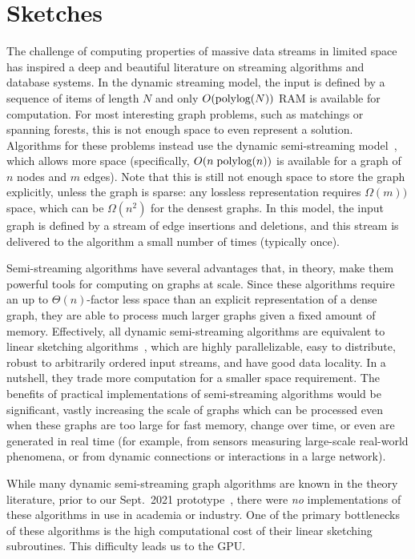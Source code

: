 \section{Sketches}



The challenge of computing properties of massive data streams in limited space has inspired a deep and beautiful literature on streaming algorithms and database systems. In the dynamic streaming model, the input is defined by a sequence of items of length $N$ and only $O(\textrm{polylog}{(N)})$ {RAM} is available for computation. For most interesting graph problems, such as matchings or spanning forests, this is not enough space to even represent a solution. Algorithms for these problems instead use the dynamic semi-streaming model~\cite{insertonlysemistreaming}, which allows more space (specifically, $O(n \; \textrm{polylog}{(n)})$  is available for a graph of $n$ nodes and $m$ edges). Note that this is still not enough space to store the graph explicitly, unless the graph is sparse: any lossless representation requires $\Omega(m))$ space, which can be $\Omega(n^2)$ for the densest graphs. In this model, the input graph is defined by a stream of edge insertions and deletions, and this stream is delivered to the algorithm a small number of times (typically once).

Semi-streaming algorithms have several advantages that, in theory, make them powerful tools for computing on graphs at scale.  Since these algorithms require an up to $\Theta(n)$-factor less space than an explicit representation of a dense graph, they are able to process much larger graphs given a fixed amount of memory. Effectively, all dynamic semi-streaming algorithms are equivalent to linear sketching algorithms~\cite{li2014sketchuniversal}, which are highly parallelizable, easy to distribute, robust to arbitrarily ordered input streams, and have good data locality. In a nutshell, they trade more computation for a smaller space requirement. %
The benefits of practical implementations of semi-streaming algorithms would be significant, vastly increasing the scale of graphs which can be processed even when these graphs are too large for fast memory, change over time, or even are generated in real time (for example, from sensors measuring large-scale real-world phenomena, or from dynamic connections or interactions in a large network).

While many dynamic semi-streaming graph algorithms\cite{Ahn2012, Ahn2012_2, AhnGM13, GuhaMT15, KapralovLMMS13, ChitnisCEHMMV16, AssadiKL16, McGregorVV16, pagh2012colorful, 10.1007/978-3-662-48054-0_39, clustering, 10.1007/978-3-319-21398-9_57, streamsetbounds, Chakrabarti2015IncidenceGA, kveton2016graphical, CrouchMS13} are known in the theory literature, prior to our Sept.\ 2021 prototype~\cite{graphzeppelin}, there were \emph{no} implementations of these algorithms in use in academia or industry.  One of the primary bottlenecks of these algorithms is the high computational cost of their linear sketching subroutines. This difficulty leads us to the GPU.

